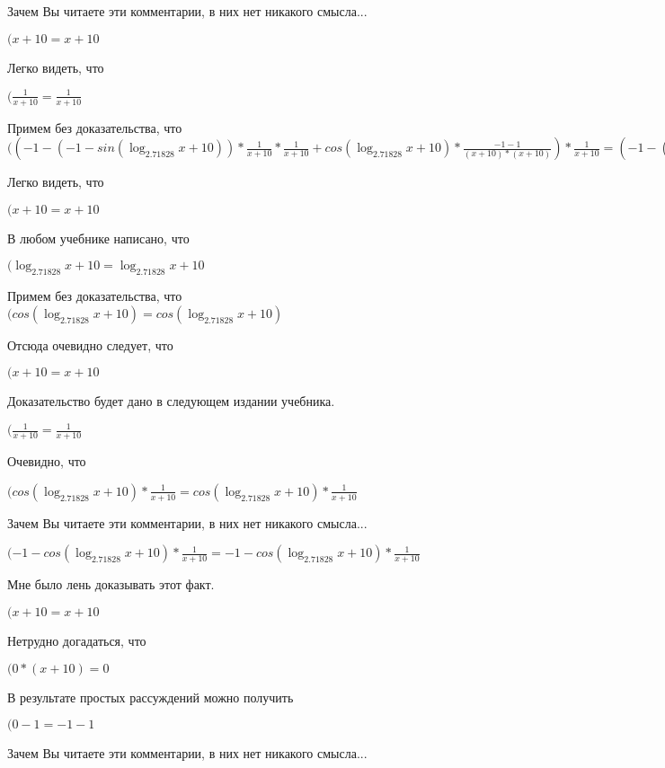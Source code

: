 \documentclass[12pt,a4paper,fleqn]{article}
\theoremstyle{definition}
\begin{document}
Зачем Вы читаете эти комментарии, в них нет никакого смысла...

$( x  +  10  =  x  +  10 $

Легко видеть, что

$(\frac{ 1 }{ x  +  10 }
 = \frac{ 1 }{ x  +  10 }
$

Примем без доказательства, что
$(( -1  - ( -1  - sin(\log_{ 2.71828 }{ x  +  10 })) * \frac{ 1 }{ x  +  10 }
 * \frac{ 1 }{ x  +  10 }
 + cos(\log_{ 2.71828 }{ x  +  10 }) * \frac{ -1  -  1 }{( x  +  10 ) * ( x  +  10 )}
) * \frac{ 1 }{ x  +  10 }
 = ( -1  - ( -1  - sin(\log_{ 2.71828 }{ x  +  10 })) * \frac{ 1 }{ x  +  10 }
 * \frac{ 1 }{ x  +  10 }
 + cos(\log_{ 2.71828 }{ x  +  10 }) * \frac{ -1  -  1 }{( x  +  10 ) * ( x  +  10 )}
) * \frac{ 1 }{ x  +  10 }
$

Легко видеть, что

$( x  +  10  =  x  +  10 $

В любом учебнике написано, что

$(\log_{ 2.71828 }{ x  +  10 } = \log_{ 2.71828 }{ x  +  10 }$

Примем без доказательства, что
$(cos(\log_{ 2.71828 }{ x  +  10 }) = cos(\log_{ 2.71828 }{ x  +  10 })$

Отсюда очевидно следует, что

$( x  +  10  =  x  +  10 $

Доказательство будет дано в следующем издании учебника.

$(\frac{ 1 }{ x  +  10 }
 = \frac{ 1 }{ x  +  10 }
$

Очевидно, что

$(cos(\log_{ 2.71828 }{ x  +  10 }) * \frac{ 1 }{ x  +  10 }
 = cos(\log_{ 2.71828 }{ x  +  10 }) * \frac{ 1 }{ x  +  10 }
$

Зачем Вы читаете эти комментарии, в них нет никакого смысла...

$( -1  - cos(\log_{ 2.71828 }{ x  +  10 }) * \frac{ 1 }{ x  +  10 }
 =  -1  - cos(\log_{ 2.71828 }{ x  +  10 }) * \frac{ 1 }{ x  +  10 }
$

Мне было лень доказывать этот факт.

$( x  +  10  =  x  +  10 $

Нетрудно догадаться, что

$( 0  * ( x  +  10 ) =  0 $

В результате простых рассуждений можно получить

$( 0  -  1  =  -1  -  1 $

Зачем Вы читаете эти комментарии, в них нет никакого смысла...
\end{document}
